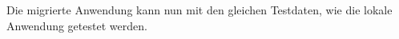 Die migrierte Anwendung kann nun mit den gleichen Testdaten, wie die lokale Anwendung getestet werden.



